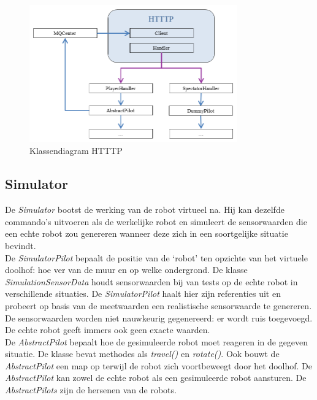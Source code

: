 \documentclass[tt2]{penoverslag}
\begin{document}
\begin{figure}[h]
\centering
	\includegraphics[width=0.8\textwidth]{KlasHTTTP}
\caption{Klassendiagram HTTTP}
\label{fig:KlasHTTTP}
\end{figure}


\subsection{Simulator}
\label{ssec:Sim}
De \textit{Simulator} bootst de werking van de robot virtueel na. Hij kan dezelfde commando's uitvoeren als de werkelijke robot en simuleert de sensorwaarden die een echte robot zou genereren wanneer deze zich in een soortgelijke situatie bevindt.\\

De \textit{SimulatorPilot} bepaalt de positie van de `robot' ten opzichte van het virtuele doolhof: hoe ver van de muur en op welke ondergrond. De klasse \textit{SimulationSensorData} houdt sensorwaarden bij van tests op de echte robot in verschillende situaties. De \textit{SimulatorPilot} haalt hier zijn referenties uit en probeert op basis van de meetwaarden een realistische sensorwaarde te genereren. De sensorwaarden worden niet nauwkeurig gegenereerd: er wordt ruis toegevoegd. De echte robot geeft immers ook geen exacte waarden.\\

De \textit{AbstractPilot} bepaalt hoe de gesimuleerde robot moet reageren in de gegeven situatie. De klasse bevat methodes als \textit{travel()} en \textit{rotate()}. Ook bouwt de \textit{AbstractPilot} een map op terwijl de robot zich voortbeweegt door het doolhof. De \textit{AbstractPilot} kan zowel de echte robot als een gesimuleerde robot aansturen. De \textit{AbstractPilots} zijn de hersenen van de robots.

\end{document}
